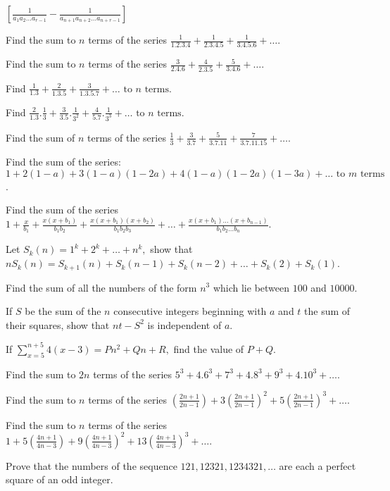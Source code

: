   $\left[\frac{1}{a_1a_2\ldots a_{r - 1}} - \frac{1}{a_{n + 1}a_{n + 2}\ldots a_{n + r - 1}}\right]$
\item Find the sum to $n$ terms of the series $\frac{1}{1.2.3.4} + \frac{1}{2.3.4.5} + \frac{1}{3.4.5.6} + \ldots$.
\item Find the sum to $n$ terms of the series $\frac{3}{2.4.6} + \frac{4}{2.3.5} + \frac{5}{3.4.6} + \ldots$.
\item Find $\frac{1}{1.3} + \frac{2}{1.3.5} + \frac{3}{1.3.5.7} + \ldots \text{~to~}n\text{~terms}$.
\item Find $\frac{2}{1.3}.\frac{1}{3} + \frac{3}{3.5}.\frac{1}{3^2} + \frac{4}{5.7}.\frac{1}{3^3} + \ldots
  \text{~to~}n\text{~terms}$.
\item Find the sum of $n$ terms of the series $\frac{1}{3} + \frac{3}{3.7} + \frac{5}{3.7.11} + \frac{7}{3.7.11.15} +
  \ldots$.
\item Find the sum of the series: $1 + 2(1 - a) + 3(1 - a)(1 - 2a) + 4(1 - a)(1 -2a)(1 - 3a) +
  \ldots\text{~to~}m\text{~terms}$.
\item Find the sum of the series $1 + \frac{x}{b_1} + \frac{x(x + b_1)}{b_1b_2} + \frac{x(x + b_1)(x + b_2)}{b_1b_2b_3} +
  \ldots + \frac{x(x + b_1)\ldots(x + b_{n - 1})}{b_1b_2\ldots b_n}$.
\item Let $S_k(n) = 1^k + 2^k + \ldots + n^k,$ show that $nS_k(n) = S_{k+1}(n) + S_k(n - 1) + S_k(n - 2) + \ldots +
  S_k(2) + S_k(1)$.
\item Find the sum of all the numbers of the form $n^3$ which lie between $100$ and $10000$.
\item If $S$ be the sum of the $n$ consecutive integers beginning with $a$ and $t$ the sum of their squares, show that
  $nt - S^2$ is independent of $a$.
\item If $\displaystyle\sum_{x = 5}^{n + 5}4(x - 3) = Pn^2 + Qn + R,$ find the value of $P + Q.$
\item Find the sum to $2n$ terms of the series $5^3 + 4.6^3 + 7^3 + 4.8^3 + 9^3 + 4.10^3 + \ldots$.
\item Find the sum to $n$ terms of the series $\left(\frac{2n + 1}{2n - 1}\right) + 3\left(\frac{2n + 1}{2n - 1}\right)^2
  + 5\left(\frac{2n + 1}{2n - 1}\right)^3 + \ldots$.
\item Find the sum to $n$ terms of the series $1 + 5\left(\frac{4n + 1}{4n - 3}\right) + 9\left(\frac{4n + 1}{4n -
  3}\right)^2 + 13\left(\frac{4n + 1}{4n - 3}\right)^3 + \ldots$.
\item Prove that the numbers of the sequence $121, 12321, 1234321, \ldots$ are each a perfect square of an odd integer.

